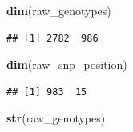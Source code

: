 \documentclass[
]{article}
\newenvironment{Shaded}{\begin{snugshade}}{\end{snugshade}}
\newcommand{\FunctionTok}[1]{\textcolor[rgb]{0.13,0.29,0.53}{\textbf{#1}}}
\newcommand{\NormalTok}[1]{#1}
\begin{document}
\begin{Shaded}
\begin{Highlighting}[]
\FunctionTok{dim}\NormalTok{(raw\_genotypes)}
\end{Highlighting}
\end{Shaded}

\begin{verbatim}
## [1] 2782  986
\end{verbatim}

\begin{Shaded}
\begin{Highlighting}[]
\FunctionTok{dim}\NormalTok{(raw\_snp\_position)}
\end{Highlighting}
\end{Shaded}

\begin{verbatim}
## [1] 983  15
\end{verbatim}

\begin{Shaded}
\begin{Highlighting}[]
\FunctionTok{str}\NormalTok{(raw\_genotypes)}
\end{Highlighting}
\end{Shaded}
\end{document}
